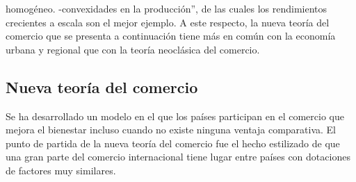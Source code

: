 homogéneo. -convexidades en la producción”, de las cuales los rendimientos crecientes a escala son el mejor ejemplo. A este respecto, la nueva teoría del comercio que se presenta a continuación tiene más en común con la economía urbana y regional que con la teoría neoclásica del comercio.

\subsection{Nueva teoría del comercio}
Se ha desarrollado un modelo en el que los países participan en el comercio que mejora el bienestar incluso cuando no existe ninguna ventaja comparativa. El punto de partida de la nueva teoría del comercio fue el hecho estilizado de que una gran parte del comercio internacional tiene lugar entre países con dotaciones de factores muy similares.\\

